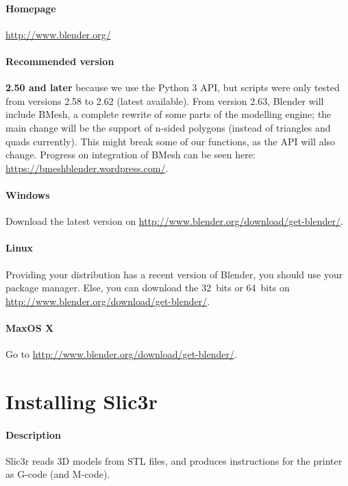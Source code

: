 \documentclass{article}
\begin{document}
	\paragraph{Homepage} \url{http://www.blender.org/}

	\paragraph{Recommended version} \textbf{2.50 and later} because we use the Python 3 API, but scripts were only tested from versions 2.58 to 2.62 (latest available). From version 2.63, Blender will include BMesh, a complete rewrite of some parts of the modelling engine; the main change will be the support of n-sided polygons (instead of triangles and quads currently). This might break some of our functions, as the API will also change. Progress on integration of BMesh can be seen here: \url{https://bmeshblender.wordpress.com/}.

	\paragraph{Windows} Download the latest version on \url{http://www.blender.org/download/get-blender/}.

	\paragraph{Linux} Providing your distribution has a recent version of Blender, you should use your package manager. Else, you can download the 32~bits or 64~bits on \url{http://www.blender.org/download/get-blender/}.

	\paragraph{MaxOS X} Go to \url{http://www.blender.org/download/get-blender/}. %

\newpage

\section{Installing Slic3r}

	\paragraph{Description} Slic3r reads 3D models from STL files, and produces instructions for the printer as G-code (and M-code).
\end{document}
